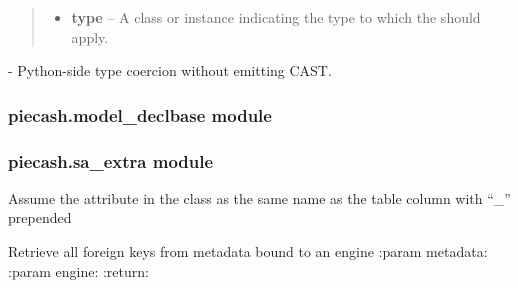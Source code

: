 \documentclass[letterpaper,10pt,english]{sphinxmanual}
\begin{document}
\begin{fulllineitems}
\begin{quote}
\begin{description}
\begin{itemize}
\item {} 
\textbf{type} -- A  class or instance indicating
the type to which the  should apply.

\end{itemize}

\end{description}\end{quote}




 - Python-side type coercion without emitting
CAST.



\end{fulllineitems}



\subsubsection{piecash.model\_declbase module}
\label{api/piecash.model_declbase:module-piecash.model_declbase}\label{api/piecash.model_declbase::doc}\label{api/piecash.model_declbase:piecash-model-declbase-module}

\subsubsection{piecash.sa\_extra module}
\label{api/piecash.sa_extra::doc}\label{api/piecash.sa_extra:module-piecash.sa_extra}\label{api/piecash.sa_extra:piecash-sa-extra-module}

\begin{fulllineitems}
\label{api/piecash.sa_extra:piecash.sa_extra.mapped_to_slot_property}
Assume the attribute in the class as the same name as the table column with ``\_'' prepended

\end{fulllineitems}


\begin{fulllineitems}
\label{api/piecash.sa_extra:piecash.sa_extra.get_foreign_keys}
Retrieve all foreign keys from metadata bound to an engine
:param metadata:
:param engine:
:return:

\end{fulllineitems}
\end{document}
